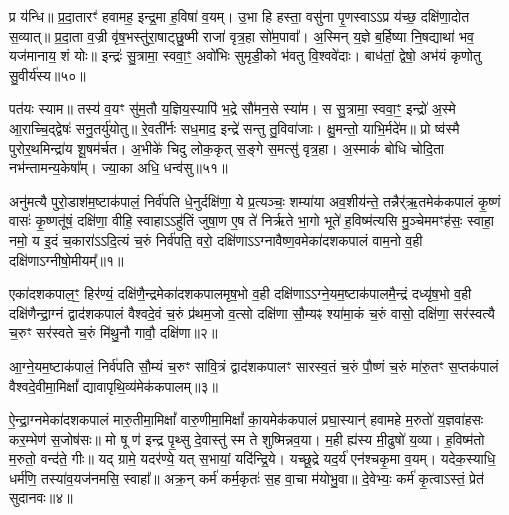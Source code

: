 प्र य॑न्धि॥ प्र॒दा॒तारꣳ॑ हवामह॒ इन्द्र॒मा ह॒विषा॑ व॒यम्। उ॒भा हि हस्ता॒ वसु॑ना पृ॒णस्वा\-ऽ\-ऽप्र य॑च्छ॒ दक्षि॑णा॒दोत स॒व्यात्॥ प्र॒दा॒ता व॒ज्री वृ॑ष॒भस्तु॑रा॒षाट्छु॒ष्मी राजा॑ वृत्र॒हा सो॑म॒पावा᳚। अ॒स्मिन् य॒ज्ञे ब॒र्\mbox{}हिष्या नि॒षद्याथा॑ भव॒ यज॑मानाय॒ शं योः॥ इन्द्रः॑ सु॒त्रामा॒ स्ववा॒ꣳ॒ अवो॑भिः सुमृडी॒को भ॑वतु वि॒श्ववे॑दाः। बाध॑तां॒ द्वेषो॒ अभ॑यं कृणोतु सु॒वीर्य॑स्य॥५०॥

पत॑यः स्याम॥ तस्य॑ व॒यꣳ सु॑म॒तौ य॒ज्ञिय॒स्यापि॑ भ॒द्रे सौ॑मन॒से स्या॑म। स सु॒त्रामा॒ स्ववा॒ꣳ॒ इन्द्रो॑ अ॒स्मे आ॒राच्चि॒द्द्वेषः॑ सनु॒तर्यु॑योतु॥ रे॒वती᳚र्नः सध॒माद॒ इन्द्रे॑ सन्तु तु॒विवा॑जाः। क्षु॒मन्तो॒ याभि॒र्मदे॑म॥ प्रो ष्व॑स्मै पुरोर॒थमिन्द्रा॑य शू॒षम॑र्चत। अ॒भीके॑ चिदु लोक॒कृत् स॒ङ्गे स॒मत्सु॑ वृत्र॒हा। अ॒स्माकं॑ बोधि चोदि॒ता नभ॑न्तामन्य॒केषा᳚म्। ज्या॒का अधि॒ धन्व॑सु॥५१॥

{\anuvakamend[{ज॒रसा॒ मा ते॑ हर्यश्व सु॒वीर्य॒स्याध्येकं॑ च॥13॥}]}

\setcounter{anuvakam}{0}
अनु॑मत्यै पुरो॒डाश॑म॒ष्टाक॑पालं॒ निर्व॑पति धे॒नुर्दक्षि॑णा॒ ये प्र॒त्यञ्चः॒ शम्या॑या अव॒शीय॑न्ते॒ तन्नैर्॑ऋ॒तमेक॑कपालं कृ॒ष्णं वासः॑ कृ॒ष्णतू॑षं॒ दक्षि॑णा॒ वीहि॒ स्वाहा\-ऽ\-ऽहु॑तिं जुषा॒ण ए॒ष ते॑ निर्\mbox{}ऋते भा॒गो भूते॑ ह॒विष्म॑त्यसि मु॒ञ्चेममꣳह॑सः॒ स्वाहा॒ नमो॒ य इ॒दं च॒कारा॑\-ऽ\-ऽदि॒त्यं च॒रुं निर्व॑पति॒ वरो॒ दक्षि॑णा\-ऽ\-ऽग्नावैष्ण॒वमेका॑दशकपालं वाम॒नो व॒ही दक्षि॑णा\-ऽग्नीषो॒मीयम्᳚॥१॥

एका॑दशकपाल॒ꣳ॒ हिर॑ण्यं॒ दक्षि॑णै॒न्द्रमेका॑दशकपालमृष॒भो व॒ही दक्षि॑णा\-ऽ\-ऽग्ने॒यम॒ष्टाक॑पालमै॒न्द्रं दध्यृ॑ष॒भो व॒ही दक्षि॑णैन्द्रा॒ग्नं द्वाद॑शकपालं वैश्वदे॒वं च॒रुं प्र॑थम॒जो व॒त्सो दक्षि॑णा सौ॒म्यꣴ श्या॑मा॒कं च॒रुं वासो॒ दक्षि॑णा॒ सर॑स्वत्यै च॒रुꣳ सर॑स्वते च॒रुं मि॑थु॒नौ गावौ॒ दक्षि॑णा॥२॥

{\anuvakamend[{अ॒ग्नी॒षो॒मीयं॒ चतु॑स्त्रिꣳशच्च॥१॥}]}

आ॒ग्ने॒यम॒ष्टाक॑पालं॒ निर्व॑पति सौ॒म्यं च॒रुꣳ सा॑वि॒त्रं द्वाद॑शकपालꣳ सारस्व॒तं च॒रुं पौ॒ष्णं च॒रुं मा॑रु॒तꣳ स॒प्तक॑पालं वैश्वदे॒वीमा॒मिक्षां᳚ द्यावापृथि॒व्य॑मेक॑कपालम्॥३॥

{\anuvakamend[{आ॒ग्ने॒यम॒ष्टाद॑श॥२॥}]}

ऐ॒न्द्रा॒ग्नमेका॑दशकपालं मारु॒तीमा॒मिक्षां᳚ वारु॒णीमा॒मिक्षां᳚ का॒यमेक॑कपालं प्रघा॒स्यान्॑ हवामहे म॒रुतो॑ य॒ज्ञवा॑हसः कर॒म्भेण॑ स॒जोष॑सः॥ मो षू ण॑ इन्द्र पृ॒थ्सु दे॒वास्तु॑ स्म ते शुष्मिन्नव॒या। म॒ही ह्य॑स्य मी॒ढुषो॑ य॒व्या। ह॒विष्म॑तो म॒रुतो॒ वन्द॑ते॒ गीः॥ यद् ग्रामे॒ यदर॑ण्ये॒ यत् स॒भायां॒ यदि॑न्द्रि॒ये। यच्छू॒द्रे यद॒र्य॑ एन॑श्चकृ॒मा व॒यम्। यदेक॒स्याधि॒ धर्म॑णि॒ तस्या॑व॒यज॑नमसि॒ स्वाहा᳚॥ अक्र॒न् कर्म॑ कर्म॒कृतः॑ स॒ह वा॒चा म॑योभु॒वा॥ दे॒वेभ्यः॒ कर्म॑ कृ॒त्वा\-ऽस्तं॒ प्रेत॑ सुदानवः॥४॥

